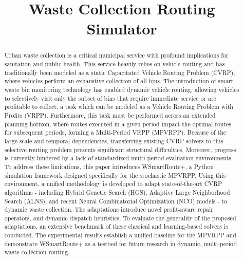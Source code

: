 \documentclass[orivec,runningheads]{llncs}
\begin{document}
\title{Waste Collection Routing Simulator}



\maketitle              %

\begin{abstract}
Urban waste collection is a critical municipal service with profound implications for sanitation and public health. This service heavily relies on vehicle routing and has traditionally been modeled as a static Capacitated Vehicle Routing Problem (CVRP), where vehicles perform an exhaustive collection of all bins. The introduction of smart waste bin monitoring technology has enabled dynamic vehicle routing, allowing vehicles to selectively visit only the subset of bins that require immediate service or are profitable to collect, a task which can be modeled as a Vehicle Routing Problem with Profits (VRPP). Furthermore, this task must be performed across an extended planning horizon, where routes executed in a given period impact the optimal routes for subsequent periods, forming a Multi-Period VRPP (MPVRPP). Because of the large scale and temporal dependencies, transferring existing CVRP solvers to this selective routing problem presents significant structural difficulties. Moreover, progress is currently hindered by a lack of standardized multi-period evaluation environments. To address these limitations, this paper introduces WSmartRoute+, a Python simulation framework designed specifically for the stochastic MPVRPP. Using this environment, a unified methodology is developed to adapt state-of-the-art CVRP algorithms - including Hybrid Genetic Search (HGS), Adaptive Large Neighborhood Search (ALNS), and recent Neural Combinatorial Optimization (NCO) models - to dynamic waste collection. The adaptations introduce novel profit-aware repair operators, and dynamic dispatch heuristics. To evaluate the generality of the proposed adaptations, an extensive benchmark of these classical and learning-based solvers is conducted. The experimental results establish a unified baseline for the MPVRPP and demonstrate WSmartRoute+ as a testbed for future research in dynamic, multi-period waste collection routing.
\end{abstract}
\end{document}
